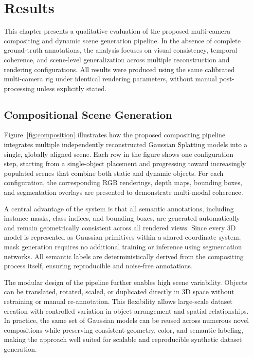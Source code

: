 \chapter{Results}

This chapter presents a qualitative evaluation of the proposed multi-camera compositing and dynamic scene generation pipeline. 
In the absence of complete ground-truth annotations, the analysis focuses on visual consistency, temporal coherence, and scene-level generalization across multiple reconstruction and rendering configurations. 
All results were produced using the same calibrated multi-camera rig under identical rendering parameters, without manual post-processing unless explicitly stated.

\section{Compositional Scene Generation}
Figure~\ref{fig:composition} illustrates how the proposed compositing pipeline integrates multiple independently reconstructed Gaussian Splatting models into a single, globally aligned scene. 
Each row in the figure shows one configuration step, starting from a single-object placement and progressing toward increasingly populated scenes that combine both static and dynamic objects.
For each configuration, the corresponding RGB renderings, depth maps, bounding boxes, and segmentation overlays are presented to demonstrate multi-modal coherence.

A central advantage of the system is that all semantic annotations, including instance masks, class indices, and bounding boxes, are generated automatically and remain geometrically consistent across all rendered views. 
Since every 3D model is represented as Gaussian primitives within a shared coordinate system, mask generation requires no additional training or inference using segmentation networks. 
All semantic labels are deterministically derived from the compositing process itself, ensuring reproducible and noise-free annotations.

The modular design of the pipeline further enables high scene variability. 
Objects can be translated, rotated, scaled, or duplicated directly in 3D space without retraining or manual re-annotation. 
This flexibility allows large-scale dataset creation with controlled variation in object arrangement and spatial relationships. 
In practice, the same set of Gaussian models can be reused across numerous novel compositions while preserving consistent geometry, color, and semantic labeling, making the approach well suited for scalable and reproducible synthetic dataset generation.

